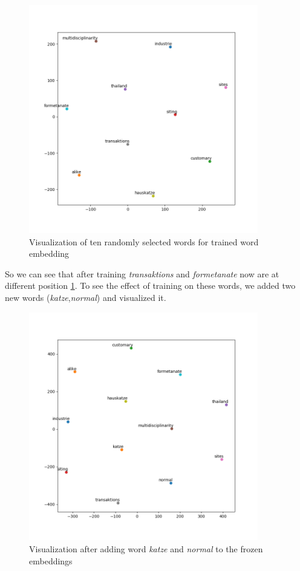 \begin{figure}[!ht]
    \centering
    \includegraphics[width=10cm,height=10cm,keepaspectratio]{pics/after_selected_embedding.png}
    \captionsetup{justification=centering,margin=1cm}
    \caption{Visualization of ten randomly selected words for trained word embedding}
    \label{fig:trainedAppendix}
\end{figure}

So we can see that after training \textit{transaktions} and \textit{formetanate} now are at different position \ref{fig:trainedAppendix}. To see the effect of training on these words, we added two new words (\textit{katze},\textit{normal}) and visualized it.

\begin{figure}[!ht]
    \centering
    \includegraphics[width=10cm,height=10cm,keepaspectratio]{pics/before_selected_added_embedding.png}
    \captionsetup{justification=centering,margin=1cm}
    \caption{Visualization after adding word \textit{katze} and \textit{normal} to the frozen embeddings}
    \label{fig:frozenAppendixAdded}
\end{figure}

